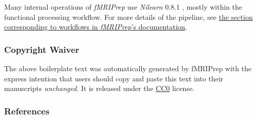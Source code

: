 \documentclass[
]{article}
\begin{document}
Many internal operations of \emph{fMRIPrep} use \emph{Nilearn} 0.8.1
\citep[RRID:SCR\_001362]{nilearn}, mostly within the functional
processing workflow. For more details of the pipeline, see
\href{https://fmriprep.readthedocs.io/en/latest/workflows.html}{the
section corresponding to workflows in \emph{fMRIPrep}'s documentation}.

\hypertarget{copyright-waiver}{%
\subsubsection{Copyright Waiver}\label{copyright-waiver}}

The above boilerplate text was automatically generated by fMRIPrep with
the express intention that users should copy and paste this text into
their manuscripts \emph{unchanged}. It is released under the
\href{https://creativecommons.org/publicdomain/zero/1.0/}{CC0} license.

\hypertarget{references}{%
\subsubsection{References}\label{references}}

  
\end{document}
